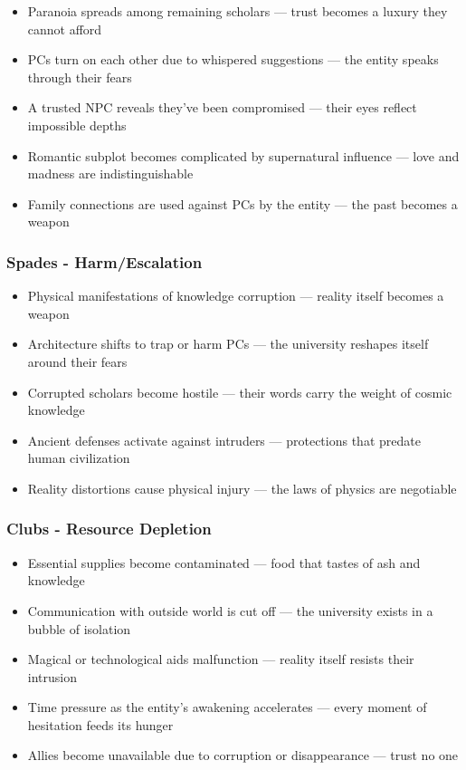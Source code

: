 \documentclass[11pt]{article}
\begin{document}
\begin{itemize}
\item Paranoia spreads among remaining scholars --- trust becomes a luxury they cannot afford
\item PCs turn on each other due to whispered suggestions --- the entity speaks through their fears
\item A trusted NPC reveals they've been compromised --- their eyes reflect impossible depths
\item Romantic subplot becomes complicated by supernatural influence --- love and madness are indistinguishable
\item Family connections are used against PCs by the entity --- the past becomes a weapon
\end{itemize}

\subsubsection{Spades - Harm/Escalation}

\begin{itemize}
\item Physical manifestations of knowledge corruption --- reality itself becomes a weapon
\item Architecture shifts to trap or harm PCs --- the university reshapes itself around their fears
\item Corrupted scholars become hostile --- their words carry the weight of cosmic knowledge
\item Ancient defenses activate against intruders --- protections that predate human civilization
\item Reality distortions cause physical injury --- the laws of physics are negotiable
\end{itemize}

\subsubsection{Clubs - Resource Depletion}

\begin{itemize}
\item Essential supplies become contaminated --- food that tastes of ash and knowledge
\item Communication with outside world is cut off --- the university exists in a bubble of isolation
\item Magical or technological aids malfunction --- reality itself resists their intrusion
\item Time pressure as the entity's awakening accelerates --- every moment of hesitation feeds its hunger
\item Allies become unavailable due to corruption or disappearance --- trust no one
\end{itemize}
\end{document}
